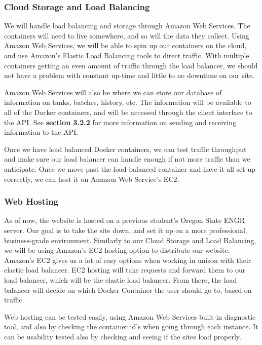 \documentclass[draftclsnofoot,onecolumn,journal,letterpaper,compsoc,10pt]{IEEEtran}
\begin{document}
        \subsubsection{Cloud Storage and Load Balancing}
            We will handle load balancing and storage through Amazon Web Services.
            The containers will need to live somewhere, and so will the data they collect. Using Amazon Web Services, we will be able to spin up our containers on the cloud, and use Amazon's Elastic Load Balancing tools to direct traffic. 
            With multiple containers getting an even amount of traffic through the load balancer, we should not have a problem with constant up-time and little to no downtime on our site. 
            
            Amazon Web Services will also be where we can store our database of information on tanks, batches, history, etc. The information will be available to all of the Docker containers, and will be accessed through the client interface to the API. See \textbf{section 3.2.2} for more information on sending and receiving information to the API.
    
            Once we have load balanced Docker containers, we can test traffic throughput and make sure our load balancer can handle enough if not more traffic than we anticipate. Once we move past the load balanced container and have it all set up correctly, we can host it on Amazon Web Service's EC2.  
        
        \subsubsection{Web Hosting}
            As of now, the website is hosted on a previous student's Oregon State ENGR server. Our goal is to take the site down, and set it up on a more professional, business-grade environment.
            Similarly to our Cloud Storage and Load Balancing, we will be using Amazon's EC2 hosting option to distribute our website. Amazon's EC2 gives us a lot of easy options when working in unison with their elastic load balancer. EC2 hosting will take requests and forward them to our load balancer, which will be the elastic load balancer. From there, the load balancer will decide on which Docker Container the user should go to, based on traffic.
            
            Web hosting can be tested easily, using Amazon Web Services built-in diagnostic tool, and also by checking the container id's when going through each instance. It can be usability tested also by checking and seeing if the sites load properly. 
            
\end{document}
